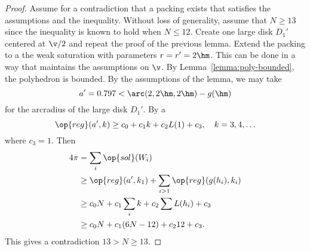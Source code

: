 \begin{proof} Assume for a contradiction that a packing exists that
satisfies the assumptions and the inequality.  Without loss of
generality, assume that $N\ge 13$ since the inequality is known to
hold when $N\le 12$.  Create one large disk $D_1'$ centered at $
\v/2$ and repeat the proof of the previous lemma.  Extend the packing to a the weak
saturation with parameters $r=r'=2\hm$.  This can be done in a way that maintains
the assumptions on $\v$.  By
Lemma~\ref{lemma:poly-bounded}, the polyhedron is
bounded.  By the assumptions of the lemma, we may take
\[ a'=0.797 < \arc(2,2\hm,2\hm)-g(\hm)\]  
for the arcradius of the large disk $D_1'$.  
By a 
\begin{equation}\label{eqn:alin2} 
\op{reg}(a',k) \ge c_0 + c_1 k + c_2 L(1) +
c_3,\quad k=3,4,\ldots\end{equation}
where
$c_3 =  1$.  %
Then 
\begin{align*} \label{eqn:D'}
4\pi &= \sum_i\op{sol}(W_i)\\
&\ge \op{reg}(a',k_1)+\sum_{i>1} \op{reg}(g(h_i),k_i) \\
&\ge  c_0 N +c_1\sum_i k + c_2 \sum L(h_i) + c_3\\
&\ge c_0 N +c_1 (6N-12) + c_2 12 + c_3.
\end{align*}
This gives a contradiction
$13 > N \ge 13.$
\end{proof}
